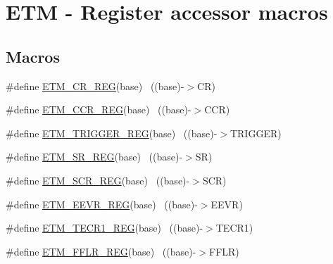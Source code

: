 \hypertarget{group___e_t_m___register___accessor___macros}{}\section{E\+TM -\/ Register accessor macros}
\label{group___e_t_m___register___accessor___macros}
\subsection*{Macros}
\begin{DoxyCompactItemize}
\item 
\#define \hyperlink{group___e_t_m___register___accessor___macros_ga7066d0e177775ee655bcca10375aef57}{E\+T\+M\+\_\+\+C\+R\+\_\+\+R\+EG}(base)                                              ~((base)-\/$>$CR)
\item 
\#define \hyperlink{group___e_t_m___register___accessor___macros_gac577bf385fd3f99d9a8188ab9088dfd8}{E\+T\+M\+\_\+\+C\+C\+R\+\_\+\+R\+EG}(base)                                            ~((base)-\/$>$C\+CR)
\item 
\#define \hyperlink{group___e_t_m___register___accessor___macros_gaf1c431dfad05a82a1d959cd58a990a0c}{E\+T\+M\+\_\+\+T\+R\+I\+G\+G\+E\+R\+\_\+\+R\+EG}(base)                                    ~((base)-\/$>$T\+R\+I\+G\+G\+ER)
\item 
\#define \hyperlink{group___e_t_m___register___accessor___macros_ga6a4e9d22d51bd337409f36921e9d285d}{E\+T\+M\+\_\+\+S\+R\+\_\+\+R\+EG}(base)                                              ~((base)-\/$>$SR)
\item 
\#define \hyperlink{group___e_t_m___register___accessor___macros_ga093217f1b3c1f107ad12524096650e20}{E\+T\+M\+\_\+\+S\+C\+R\+\_\+\+R\+EG}(base)                                            ~((base)-\/$>$S\+CR)
\item 
\#define \hyperlink{group___e_t_m___register___accessor___macros_gaf7909133ed79504519ee7750ae2135f9}{E\+T\+M\+\_\+\+E\+E\+V\+R\+\_\+\+R\+EG}(base)                                          ~((base)-\/$>$E\+E\+VR)
\item 
\#define \hyperlink{group___e_t_m___register___accessor___macros_ga3572a8d0b81ce0cfd265b19c612f98f3}{E\+T\+M\+\_\+\+T\+E\+C\+R1\+\_\+\+R\+EG}(base)                                        ~((base)-\/$>$T\+E\+C\+R1)
\item 
\#define \hyperlink{group___e_t_m___register___accessor___macros_ga3d97ceefa1ff8487d539631c08a6e457}{E\+T\+M\+\_\+\+F\+F\+L\+R\+\_\+\+R\+EG}(base)                                          ~((base)-\/$>$F\+F\+LR)

\end{DoxyCompactItemize}
